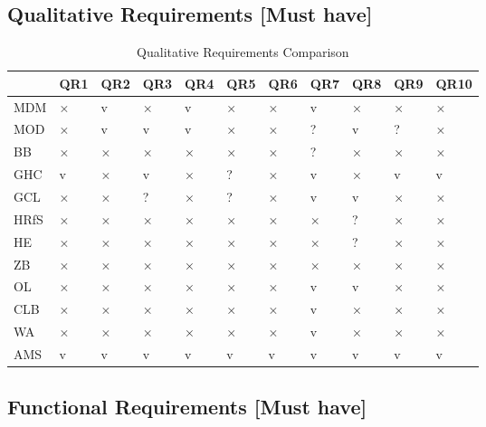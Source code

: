 \subsection{Qualitative Requirements {[}Must have{]}} \label{ssec:eval-qual}

\begin{table}[H]
    \centering
    \bgroup
    \def\arraystretch{1.5}
    \begin{tabular}{|l|l|l|l|l|l|l|l|l|l|l|}
    \hline
         & QR1 & QR2 & QR3 & QR4 & QR5 & QR6 & QR7 & QR8 & QR9 & QR10 \\ \hline
        MDM & × & v & × & v & × & × & v & × & × & × \\ \hline
        MOD & × & v & v & v & × & × & ? & v & ? & × \\ \hline
        BB & × & × & × & × & × & × & ? & × & × & × \\ \hline
        GHC & v & × & v & × & ? & × & v & × & v & v \\ \hline
        GCL & × & × & ? & × & ? & × & v & v & × & × \\ \hline
        HRfS & × & × & × & × & × & × & × & ? & × & × \\ \hline
        HE & × & × & × & × & × & × & × & ? & × & × \\ \hline
        ZB & × & × & × & × & × & × & × & × & × & × \\ \hline
        OL & × & × & × & × & × & × & v & v & × & × \\ \hline
        CLB & × & × & × & × & × & × & v & × & × & × \\ \hline
        WA & × & × & × & × & × & × & v & × & × & × \\ \hline
        AMS & v & v & v & v & v & v & v & v & v & v \\ \hline
    \end{tabular}
    \egroup
    \caption{Qualitative Requirements Comparison}
\end{table}

\subsection{Functional Requirements {[}Must have{]}} \label{ssec:eval-func}

